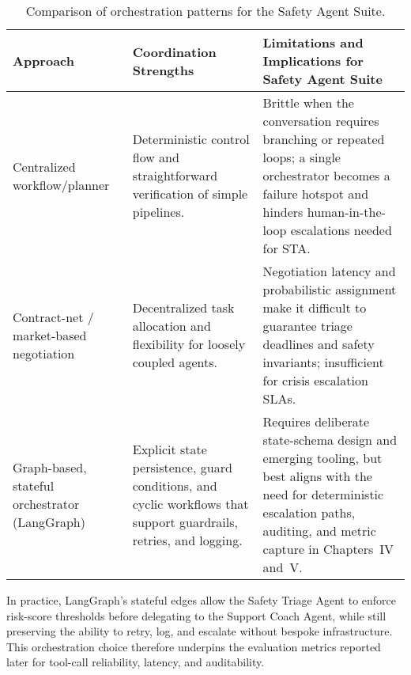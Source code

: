 \begin{table}[h]
    \centering
    \caption{Comparison of orchestration patterns for the Safety Agent Suite.}
    \label{tab:orchestration_patterns}
    \begin{tabular}{p{3.4cm}p{4.0cm}p{4.0cm}}
        \toprule
        \textbf{Approach} & \textbf{Coordination Strengths} & \textbf{Limitations and Implications for Safety Agent Suite} \\
        \midrule
        Centralized workflow/planner \cite{wooldridge2009introductionmas} & Deterministic control flow and straightforward verification of simple pipelines. & Brittle when the conversation requires branching or repeated loops; a single orchestrator becomes a failure hotspot and hinders human-in-the-loop escalations needed for STA. \\
        Contract-net / market-based negotiation \cite{wooldridge1995intelligentagents,tran2025multiagentcollaboration} & Decentralized task allocation and flexibility for loosely coupled agents. & Negotiation latency and probabilistic assignment make it difficult to guarantee triage deadlines and safety invariants; insufficient for crisis escalation SLAs. \\
        Graph-based, stateful orchestrator (LangGraph) \cite{yang2025aiagentprotocols,yu2025agentworkflow} & Explicit state persistence, guard conditions, and cyclic workflows that support guardrails, retries, and logging. & Requires deliberate state-schema design and emerging tooling, but best aligns with the need for deterministic escalation paths, auditing, and metric capture in Chapters~IV and~V. \\
        \bottomrule
    \end{tabular}
\end{table}

In practice, LangGraph's stateful edges allow the Safety Triage Agent to enforce risk-score thresholds before delegating to the Support Coach Agent, while still preserving the ability to retry, log, and escalate without bespoke infrastructure. This orchestration choice therefore underpins the evaluation metrics reported later for tool-call reliability, latency, and auditability.

